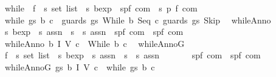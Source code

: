 \begin{isabellebody}
\isanewline
\ \ while{\isacharcolon}{\isacharcolon}\ \ {\isachardoublequoteopen}{\isacharparenleft}{\isacharprime}f\ {\isasymtimes}\ {\isacharprime}s\ set{\isacharparenright}\ list\ {\isasymRightarrow}\ {\isacharprime}s\ bexp\ {\isasymRightarrow}\ {\isacharparenleft}{\isacharprime}s{\isacharcomma}{\isacharprime}p{\isacharcomma}{\isacharprime}f{\isacharparenright}\ com\ {\isasymRightarrow}\ {\isacharparenleft}{\isacharprime}s{\isacharcomma}\ {\isacharprime}p{\isacharcomma}\ {\isacharprime}f{\isacharparenright}\ com{\isachardoublequoteclose}\isanewline
{}\isanewline
\ \ {\isachardoublequoteopen}while\ gs\ b\ c\ {\isacharequal}\ guards\ gs\ {\isacharparenleft}While\ b\ {\isacharparenleft}Seq\ c\ {\isacharparenleft}guards\ gs\ Skip{\isacharparenright}{\isacharparenright}{\isacharparenright}{\isachardoublequoteclose}\isanewline
\isanewline
{}\isamarkupfalse%
\isanewline
\ \ whileAnno{\isacharcolon}{\isacharcolon}\ \isanewline
\ \ {\isachardoublequoteopen}{\isacharprime}s\ bexp\ {\isasymRightarrow}\ {\isacharprime}s\ assn\ {\isasymRightarrow}\ {\isacharparenleft}{\isacharprime}s\ {\isasymtimes}\ {\isacharprime}s{\isacharparenright}\ assn\ {\isasymRightarrow}\ {\isacharparenleft}{\isacharprime}s{\isacharcomma}{\isacharprime}p{\isacharcomma}{\isacharprime}f{\isacharparenright}\ com\ {\isasymRightarrow}\ {\isacharparenleft}{\isacharprime}s{\isacharcomma}{\isacharprime}p{\isacharcomma}{\isacharprime}f{\isacharparenright}\ com{\isachardoublequoteclose}\ \isanewline
\ \ {\isachardoublequoteopen}whileAnno\ b\ I\ V\ c\ {\isacharequal}\ While\ b\ c{\isachardoublequoteclose}\isanewline
\isanewline
{}\isamarkupfalse%
\isanewline
\ \ whileAnnoG{\isacharcolon}{\isacharcolon}\ \isanewline
\ \ {\isachardoublequoteopen}{\isacharparenleft}{\isacharprime}f\ {\isasymtimes}\ {\isacharprime}s\ set{\isacharparenright}\ list\ {\isasymRightarrow}\ {\isacharprime}s\ bexp\ {\isasymRightarrow}\ {\isacharprime}s\ assn\ {\isasymRightarrow}\ {\isacharparenleft}{\isacharprime}s\ {\isasymtimes}\ {\isacharprime}s{\isacharparenright}\ assn\ {\isasymRightarrow}\ \isanewline
\ \ \ \ \ {\isacharparenleft}{\isacharprime}s{\isacharcomma}{\isacharprime}p{\isacharcomma}{\isacharprime}f{\isacharparenright}\ com\ {\isasymRightarrow}\ {\isacharparenleft}{\isacharprime}s{\isacharcomma}{\isacharprime}p{\isacharcomma}{\isacharprime}f{\isacharparenright}\ com{\isachardoublequoteclose}\ \isanewline
\ \ {\isachardoublequoteopen}whileAnnoG\ gs\ b\ I\ V\ c\ {\isacharequal}\ while\ gs\ b\ c{\isachardoublequoteclose}\isanewline

\end{isabellebody}
